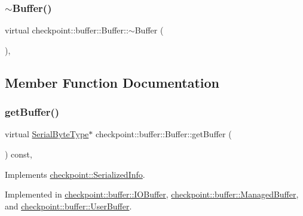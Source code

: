 \subsubsection{\texorpdfstring{$\sim$\+Buffer()}{~Buffer()}}
{\footnotesize\ttfamily virtual checkpoint\+::buffer\+::\+Buffer\+::$\sim$\+Buffer (\begin{DoxyParamCaption}{ }\end{DoxyParamCaption})\hspace{0.3cm}{\ttfamily [inline]}, {\ttfamily [virtual]}}



\subsection{Member Function Documentation}
\mbox{\label{structcheckpoint_1_1buffer_1_1_buffer_a11fcf5b280408aef29cd21dd722006c3}} 
\subsubsection{\texorpdfstring{get\+Buffer()}{getBuffer()}}
{\footnotesize\ttfamily virtual \hyperlink{namespacecheckpoint_ae57f01cdc0b81776c23b6c7c934c58f5}{Serial\+Byte\+Type}$\ast$ checkpoint\+::buffer\+::\+Buffer\+::get\+Buffer (\begin{DoxyParamCaption}{ }\end{DoxyParamCaption}) const\hspace{0.3cm}{\ttfamily [override]}, {}}



Implements \hyperlink{structcheckpoint_1_1_serialized_info_aa941e773b665a69a856996d243e7f2c7}{checkpoint\+::\+Serialized\+Info}.



Implemented in \hyperlink{structcheckpoint_1_1buffer_1_1_i_o_buffer_ac0ff5457dbbec216ce8620ad25e283fa}{checkpoint\+::buffer\+::\+I\+O\+Buffer}, \hyperlink{structcheckpoint_1_1buffer_1_1_managed_buffer_a9a44d0c4e088ac080f13c84072a86e91}{checkpoint\+::buffer\+::\+Managed\+Buffer}, and \hyperlink{structcheckpoint_1_1buffer_1_1_user_buffer_a1a71a6378472d56c8c17f01dd44462b7}{checkpoint\+::buffer\+::\+User\+Buffer}.

\mbox{\label{structcheckpoint_1_1buffer_1_1_buffer_a8f21655f43c4424cd88435ddebbb2d3c}} 
